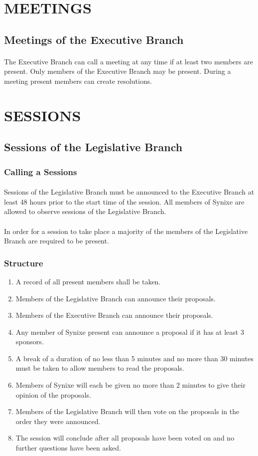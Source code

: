 \documentclass[10pt,a4paper]{article}
\begin{document}
\section{MEETINGS}
\subsection{Meetings of the Executive Branch}
\paragraph{}
The Executive Branch can call a meeting at any time if at least two members are present. Only members of the Executive Branch may be present. During a meeting present members can create resolutions.
\section{SESSIONS}
\subsection{Sessions of the Legislative Branch}
\subsubsection{Calling a Sessions}
\paragraph{}
Sessions of the Legislative Branch must be announced to the Executive Branch at least 48 hours prior to the start time of the session. All members of Synixe are allowed to observe sessions of the Legislative Branch.
\paragraph{}
In order for a session to take place a majority of the members of the Legislative Branch are required to be present.
\subsubsection{Structure}
\begin{enumerate}
	\item A record of all present members shall be taken.
	\item Members of the Legislative Branch can announce their proposals.
	\item Members of the Executive Branch can announce their proposals.
	\item Any member of Synixe present can announce a proposal if it has at least 3 sponsors.
	\item A break of a duration of no less than 5 minutes and no more than 30 minutes must be taken to allow members to read the proposals.
	\item Members of Synixe will each be given no more than 2 minutes to give their opinion of the proposals.
	\item Members of the Legislative Branch will then vote on the proposals in the order they were announced.
	\item The session will conclude after all proposals have been voted on and no further questions have been asked.
\end{enumerate}
\end{document}
